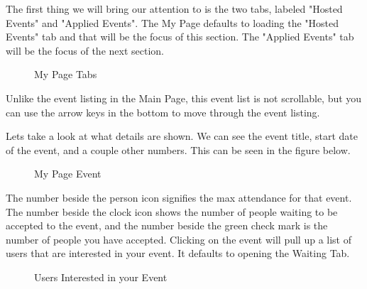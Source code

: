 \documentclass[10pt]{article}
\begin{document}
			The first thing we will bring our attention to is the two tabs, labeled "Hosted Events" and "Applied Events". The My Page defaults to loading the "Hosted Events" tab and that will be the focus of this section. The "Applied Events" tab will be the focus of the next section.
		
			\begin{figure}[H]
				\centering
				\caption{My Page Tabs}
				\label{fig:awesome_image}
			\end{figure}		
			
			Unlike the event listing in the Main Page, this event list is not scrollable, but you can use the arrow keys in the bottom to move through the event listing. \par 
			Lets take a look at what details are shown. We can see the event title, start date of the event, and a couple other numbers. This can be seen in the figure below.
			
			\begin{figure}[H]
				\centering
				\caption{My Page Event}
				\label{fig:awesome_image}
			\end{figure}
			
			The number beside the person icon signifies the max attendance for that event. The number beside the clock icon shows the number of people waiting to be accepted to the event, and the number beside the green check mark is the number of people you have accepted. Clicking on the event will pull up a list of users that are interested in your event. It defaults to opening the Waiting Tab.
			
			\begin{figure}[H]
				\centering
				\caption{Users Interested in your Event}
				\label{fig:awesome_image}
			\end{figure}
			
\end{document}
